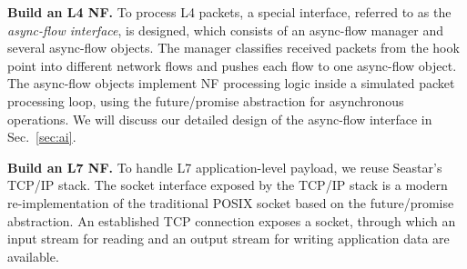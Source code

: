 





\textbf{Build an L4 NF.} To process L4 packets, a special interface, referred to as the {\em async-flow interface}, is designed, which consists of an async-flow manager and several async-flow objects. %
The manager classifies received packets from the hook point into different network flows and pushes each flow to one async-flow object. The async-flow objects implement NF processing logic inside a simulated packet processing loop, using the future/promise abstraction for asynchronous operations. We will discuss our detailed design of the async-flow interface in Sec.~\ref{sec:ai}.

\textbf{Build an L7 NF.} To handle L7 application-level payload, we reuse Seastar's TCP/IP stack. The socket interface exposed by the TCP/IP stack is a modern re-implementation of the traditional POSIX socket based on the future/promise abstraction. An established TCP connection exposes a socket, through which an input stream for reading and an output stream for writing application data are available. %


